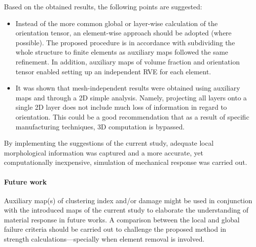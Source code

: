 	Based on the obtained results, the following points are suggested:
	\begin{itemize}
		\item Instead of the more common global or layer-wise calculation of the orientation tensor, an element-wise approach should be adopted (where possible). The proposed procedure is in accordance with subdividing the whole structure to finite elements as auxiliary maps followed the same refinement. In addition, auxiliary maps of volume fraction and orientation tensor enabled setting up an independent RVE for each element. 
		\item It was shown that mesh-independent results were obtained using auxiliary maps and through a 2D simple analysis. Namely, projecting all layers onto a single 2D layer does not include much loss of information in regard to orientation. This could be a good recommendation that as a result of specific manufacturing techniques, 3D computation is bypassed. 
	\end{itemize}
	By implementing the suggestions of the current study, adequate local morphological information was captured and a more accurate, yet computationally inexpensive, simulation of mechanical response was carried out.	

	\paragraph{Future work} Auxiliary map(s) of clustering index and/or damage might be used in conjunction with the introduced maps of the current study to elaborate the understanding of  material response in future works. A comparison between the local and global failure criteria should be carried out to challenge the proposed method in strength calculations---specially when element removal is involved.

